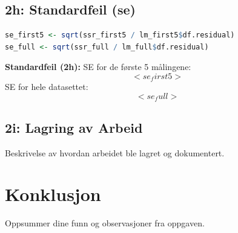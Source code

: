 \documentclass{article}
\begin{document}
\subsection{2h: Standardfeil (se)}
\begin{lstlisting}[language=R]
se_first5 <- sqrt(ssr_first5 / lm_first5$df.residual)
se_full <- sqrt(ssr_full / lm_full$df.residual)
\end{lstlisting}
\textbf{Standardfeil (2h):} SE for de første 5 målingene: \[ <se_first5> \]
SE for hele datasettet: \[ <se_full> \]

\subsection{2i: Lagring av Arbeid}
Beskrivelse av hvordan arbeidet ble lagret og dokumentert.

\section{Konklusjon}
Oppsummer dine funn og observasjoner fra oppgaven.
\end{document}
